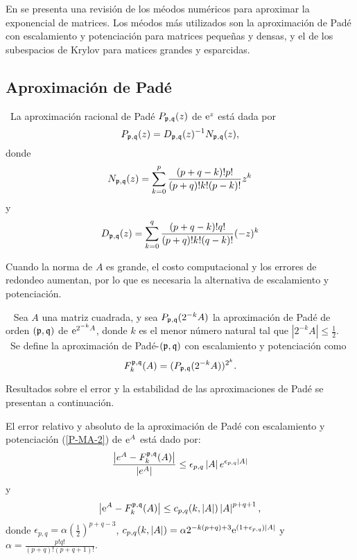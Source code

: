 En \cite{golub2013matrix} se presenta una revisión de los méodos numéricos
para aproximar
la exponencial de matrices. Los méodos más utilizados son la aproximación de Padé con escalamiento
y potenciación para matrices pequeñas y densas, y el de los subespacios de Krylov para matices grandes y esparcidas.


\subsection{Aproximación de Padé}\label{section:pade-approx}

\begin{definition}
    \cite{golub2013matrix}~La aproximación racional de Padé $P_{\mathfrak{p},\mathfrak{q}}(z)$
    de $\mathrm{e}^{z}$ est\'{a} dada por 
    \begin{equation*}
    P_{\mathfrak{p},\mathfrak{q}}(z)=D_{\mathfrak{p},\mathfrak{q}}(z)^{-1}N_{\mathfrak{p},\mathfrak{q}}(z),  \label{FORM PADE}
    \end{equation*}%
    donde 
    \[
    N_{\mathfrak{p},\mathfrak{q}}(z)=\sum\limits_{k=0}^p\frac{(p+q-k)!p!}{(p+q)!k!(p-k)!}z^k
    \]%
    y 
    \[
    D_{\mathfrak{p},\mathfrak{q}}(z)=\sum\limits_{k=0}^q\frac{(p+q-k)!q!}{(p+q)!k!(q-k)!}(-z)^k
    \]
\end{definition}

Cuando la norma de $A$ es grande, el costo computacional  y los errores de redondeo aumentan, por lo que
es necesaria la alternativa de escalamiento y potenciación.

\begin{definition}\cite{golub2013matrix}~
    Sea $A$ una matriz cuadrada, y sea $P_{\pf,\qf}(2^{-k}A%
    )$ la aproximación de Padé de orden $(\mathfrak{p},\mathfrak{q})\ $de $\me{2^{-k}A%
    }$, donde $k$ es el menor número natural tal que $\left\vert 2^{-k}A%
    \right\vert \leq \frac{1}{2}$. \ Se define la aproximación de  Padé-$(\mathfrak{p},\mathfrak{q})$ con escalamiento y potenciación como 
    \begin{equation}
    F_{k}^{\mathfrak{p},\mathfrak{q}}(A)=(P_{\mathfrak{p},\mathfrak{q}}(2^{-k}A))^{2^{k}}.
    \label{P-MA-2}
    \end{equation}
\end{definition}

Resultados sobre el error y la estabilidad de las aproximaciones de Padé se presentan a continuación.

\begin{theorem}
    \label{Conv. Pade}\cite{jimenez2012convergence} El error
    relativo y absoluto de la aproximación de Padé con escalamiento y
    potenciación (\ref{P-MA-2}) de $\mathrm{e}^{A}$ est\'{a} dado por: 
    \[
    \frac{\left\vert e^{A}-F_{k}^{\mathfrak{p},\mathfrak{q}}(A)\right\vert 
    }{\left\vert e^{A}\right\vert }\leq \epsilon _{p,q}\left\vert 
    A\right\vert e^{\epsilon _{p,q}\left\vert A\right\vert }
    \]%
    y 
    \begin{equation}
    \left\vert \mathrm{e}^{A}-F_{k}^{\mathfrak{p},\mathfrak{q}}(A)\right\vert \leq
    c_{p,q}(k,\left\vert A\right\vert )\left\vert A\right\vert
    ^{p+q+1}, \label{errpade}
    \end{equation}
    donde $\epsilon _{p,q}=\alpha (\frac{1}{2})^{p+q-3}$, $%
    c_{p,q}(k,\left\vert A\right\vert )=\alpha
    2^{-k(p+q)+3}\me{(1+\epsilon _{p,q})\left\vert A\right\vert }$ y $%
    \alpha =\frac{p!q!}{(p+q)!(p+q+1)!}$.
\end{theorem}

